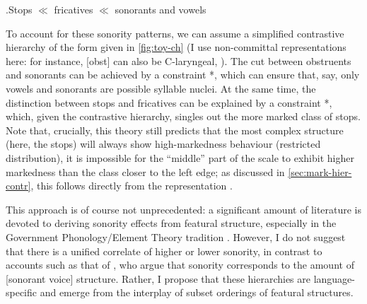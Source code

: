 \ex.\label{ex:toy-hierarchy}Stops $\ll$ fricatives $\ll$ sonorants and vowels

To account for these sonority patterns, we can assume a simplified contrastive hierarchy of the form given in \cref{fig:toy-ch} (I use non\hyp committal representations here: for instance, [obst] can also be C-laryngeal, \cf \citealt{blaho-diss}). The cut between obstruents and sonorants can be achieved by a constraint *\mo[obst], which can ensure that, say, only vowels and sonorants are possible syllable nuclei. At the same time, the distinction between stops and fricatives can be explained by a constraint *\mo[closed], which, given the contrastive hierarchy, singles out the more marked class of stops. Note that, crucially, this theory still predicts that the most complex structure (here, the stops) will always show high\hyp markedness behaviour (\eg restricted distribution), \ie it is impossible for the \enquote{middle} part of the scale to exhibit higher markedness than the class closer to the left edge; as discussed in \cref{sec:mark-hier-contr}, this follows directly from the representation \citep[\cfm][]{causley99:_compl_optim_theor,rice03:_featur}.

This approach is of course not unprecedented: a significant amount of literature is devoted to deriving sonority effects from featural structure, especially in the Government Phonology\fshyp Element Theory tradition \citep[\egm][]{harris90:_segmen,harris97:_licen_inher,harris06,scheer99,scheer04,torre03:_dutch,hermans05:_again,gussmann07,cyran10:_compl}. However, I do not suggest that there is a unified correlate of higher or lower sonority, in contrast to accounts such as that of \citet{rice89,rice92}, who argue that sonority corresponds to the amount of [sonorant voice] structure. Rather, I propose that these hierarchies are language\hyp specific and emerge from the interplay of subset orderings of featural structures.

